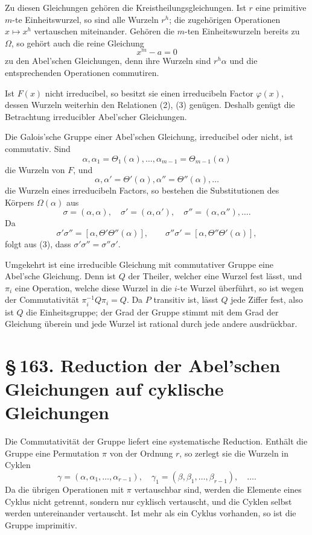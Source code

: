 \documentclass[11pt]{article}
\providecommand{\sect}[2]{\section*{\S\,#1. #2}}
\begin{document}
Zu diesen Gleichungen gehören die Kreistheilungsgleichungen. Ist $r$ eine primitive $m$-te Einheitswurzel, so sind alle Wurzeln $r^h$; die zugehörigen Operationen $x\mapsto x^h$ vertauschen miteinander. Gehören die $m$-ten Einheitswurzeln bereits zu $\Omega$, so gehört auch die reine Gleichung
\[
        x^m-a=0
\]
zu den Abel'schen Gleichungen, denn ihre Wurzeln sind $r^h\alpha$ und die entsprechenden Operationen commutiren.

Ist $F(x)$ nicht irreducibel, so besitzt sie einen irreducibeln Factor $\varphi(x)$, dessen Wurzeln weiterhin den Relationen (2), (3) genügen. Deshalb genügt die Betrachtung irreducibler Abel'scher Gleichungen.

Die Galois'sche Gruppe einer Abel'schen Gleichung, irreducibel oder nicht, ist commutativ. Sind
\[
        \alpha,\alpha_1=\Theta_1(\alpha),\ldots,
        \alpha_{m-1}=\Theta_{m-1}(\alpha)                               \tag{4}
\]
die Wurzeln von $F$, und
\[
        \alpha,\alpha'=\Theta'(\alpha),\alpha''=\Theta''(\alpha),\ldots   \tag{5}
\]
die Wurzeln eines irreducibeln Factors, so bestehen die Substitutionen des Körpers $\Omega(\alpha)$ aus
\[
        \sigma=(\alpha,\alpha),\quad
        \sigma'=(\alpha,\alpha'),\quad
        \sigma''=(\alpha,\alpha''),\ldots.                              \tag{6}
\]
Da
\[
\sigma'\sigma''=[\alpha,\Theta'\Theta''(\alpha)],\qquad
\sigma''\sigma'=[\alpha,\Theta''\Theta'(\alpha)],
\]
folgt aus (3), dass $\sigma'\sigma''=\sigma''\sigma'$.

Umgekehrt ist eine irreducible Gleichung mit commutativer Gruppe eine Abel'sche Gleichung. Denn ist $Q$ der Theiler, welcher eine Wurzel fest lässt, und $\pi_i$ eine Operation, welche diese Wurzel in die $i$-te Wurzel überführt, so ist wegen der Commutativität $\pi_i^{-1}Q\pi_i=Q$. Da $P$ transitiv ist, lässt $Q$ jede Ziffer fest, also ist $Q$ die Einheitsgruppe; der Grad der Gruppe stimmt mit dem Grad der Gleichung überein und jede Wurzel ist rational durch jede andere ausdrückbar.

\sect{163}{Reduction der Abel'schen Gleichungen auf cyklische Gleichungen}

Die Commutativität der Gruppe liefert eine systematische Reduction. Enthält die Gruppe eine Permutation $\pi$ von der Ordnung $r$, so zerlegt sie die Wurzeln in Cyklen
\[
        \gamma=(\alpha,\alpha_1,\ldots,\alpha_{r-1}),\quad
        \gamma_1=(\beta,\beta_1,
        \ldots,\beta_{r-1}),\quad \ldots .                              \tag{1}
\]
Da die übrigen Operationen mit $\pi$ vertauschbar sind, werden die Elemente eines Cyklus nicht getrennt, sondern nur cyklisch vertauscht, und die Cyklen selbst werden untereinander vertauscht. Ist mehr als ein Cyklus vorhanden, so ist die Gruppe imprimitiv.
\end{document}
